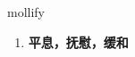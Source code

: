 
\begin{frame}
{\huge mollify}
\begin{center}
\begin{enumerate}\Large
  \item \textbf{平息，抚慰，缓和}
\end{enumerate}
\end{center}
\end{frame}
